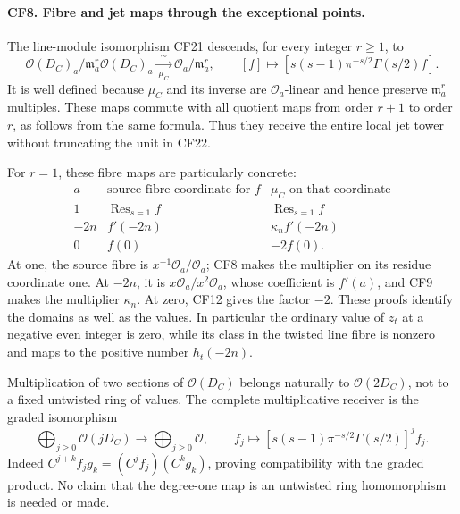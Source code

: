 \paragraph{CF8. Fibre and jet maps through the exceptional points.}
The line-module isomorphism CF21 descends, for every
integer \(r\ge1\), to
\[
 \mathcal O(D_C)_a/\mathfrak m_a^r\mathcal O(D_C)_a
 \xrightarrow[\ \mu_C\ ]{\ \sim\ }
 \mathcal O_a/\mathfrak m_a^r,\qquad
 [f]\longmapsto
 [s(s-1)\pi^{-s/2}\Gamma(s/2)f].
 \tag{CF27}
\]
It is well defined because \(\mu_C\) and its inverse
are \(\mathcal O_a\)-linear and hence preserve
\(\mathfrak m_a^r\) multiples. These maps commute with
all quotient maps from order \(r+1\) to order \(r\),
as follows from the same formula. Thus they receive
the entire local jet tower without truncating the
unit in CF22.

For \(r=1\), these fibre maps are particularly concrete:
\[
 \begin{array}{c|c|c}
 a&\text{source fibre coordinate for }f&\mu_C
       \text{ on that coordinate}\\ \hline
 1&\operatorname{Res}_{s=1}f&
            \operatorname{Res}_{s=1}f\\
 -2n&f'(-2n)&\kappa_n f'(-2n)\\
 0&f(0)&-2f(0).
 \end{array}\tag{CF28}
\]
At one, the source fibre is \(x^{-1}\mathcal O_a/\mathcal O_a\);
CF8 makes the multiplier on its residue coordinate one.
At \(-2n\), it is \(x\mathcal O_a/x^2\mathcal O_a\),
whose coefficient is \(f'(a)\), and CF9 makes the
multiplier \(\kappa_n\).
At zero, CF12 gives the factor \(-2\).
These proofs identify the domains as well as the values.
In particular the ordinary value of \(z_t\) at a
negative even integer is zero, while its class in the
twisted line fibre is nonzero and maps to the positive
number \(h_t(-2n)\).

Multiplication of two sections of \(\mathcal O(D_C)\)
belongs naturally to \(\mathcal O(2D_C)\), not to a
fixed untwisted ring of values. The complete multiplicative
receiver is the graded isomorphism
\[
 \bigoplus_{j\ge0}\mathcal O(jD_C)
 \longrightarrow\bigoplus_{j\ge0}\mathcal O,\qquad
 f_j\longmapsto
 [s(s-1)\pi^{-s/2}\Gamma(s/2)]^j f_j .
 \tag{CF29}
\]
Indeed \(C^{j+k}f_jg_k=(C^jf_j)(C^kg_k)\), proving
compatibility with the graded product. No claim that
the degree-one map is an untwisted ring homomorphism
is needed or made.

